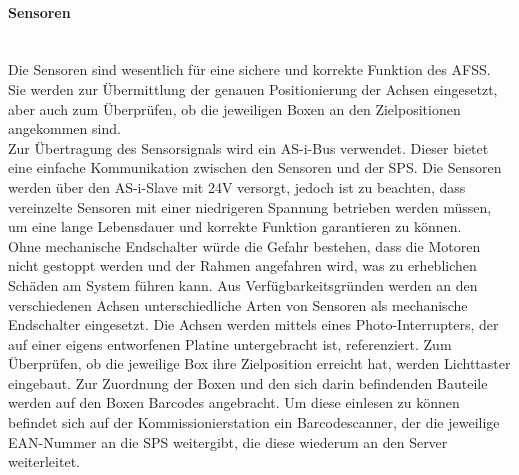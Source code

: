 \paragraph{Sensoren}\mbox{}\\
Die Sensoren sind wesentlich für eine sichere und korrekte Funktion des AFSS. Sie werden zur Übermittlung der genauen Positionierung der Achsen eingesetzt, aber auch zum Überprüfen, ob die jeweiligen Boxen an den Zielpositionen angekommen sind.\\
Zur Übertragung des Sensorsignals wird ein AS-i-Bus verwendet. Dieser bietet eine einfache Kommunikation zwischen den Sensoren und der SPS. Die Sensoren werden über den AS-i-Slave mit 24V versorgt, jedoch ist zu beachten, dass vereinzelte Sensoren mit einer niedrigeren Spannung betrieben werden müssen, um eine lange Lebensdauer und korrekte Funktion garantieren zu können.\\
Ohne mechanische Endschalter würde die Gefahr bestehen, dass die Motoren nicht gestoppt werden und der Rahmen angefahren wird, was zu erheblichen Schäden am System führen kann. Aus Verfügbarkeitsgründen  werden an den verschiedenen Achsen unterschiedliche Arten von Sensoren als mechanische Endschalter eingesetzt. Die Achsen werden mittels eines Photo-Interrupters, der auf einer eigens entworfenen Platine untergebracht ist, referenziert. Zum Überprüfen, ob die jeweilige Box ihre Zielposition erreicht hat, werden Lichttaster eingebaut. Zur Zuordnung der Boxen und den sich darin befindenden Bauteile werden auf den Boxen Barcodes angebracht. Um diese einlesen zu können befindet sich auf der Kommissionierstation ein Barcodescanner, der die jeweilige EAN-Nummer an die SPS weitergibt, die diese wiederum an den Server weiterleitet.\\


